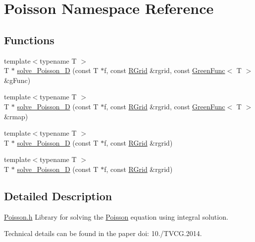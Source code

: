 \hypertarget{namespace_poisson}{}\section{Poisson Namespace Reference}
\label{namespace_poisson}
\subsection*{Functions}
\begin{DoxyCompactItemize}
\item 
{\footnotesize template$<$typename T $>$ }\\T $\ast$ \hyperlink{namespace_poisson_a28367c6c5e9568c1d031cad62354676d}{solve\+\_\+\+Poisson\+\_\+D} (const T $\ast$f, const \hyperlink{struct_r_grid}{R\+Grid} \&rgrid, const \hyperlink{class_green_func}{Green\+Func}$<$ T $>$ \&g\+Func)
\item 
{\footnotesize template$<$typename T $>$ }\\T $\ast$ \hyperlink{namespace_poisson_a7c7163908fcf6a2b0444e3ad1b808156}{solve\+\_\+\+Poisson\+\_\+D} (const T $\ast$f, const \hyperlink{struct_r_grid}{R\+Grid} \&rgrid, const \hyperlink{class_green_func}{Green\+Func}$<$ T $>$ \&rmap)
\item 
{\footnotesize template$<$typename T $>$ }\\T $\ast$ \hyperlink{namespace_poisson_ae5286eed57168b5680b7ae461daa397b}{solve\+\_\+\+Poisson\+\_\+D} (const T $\ast$f, const \hyperlink{struct_r_grid}{R\+Grid} \&rgrid)
\item 
{\footnotesize template$<$typename T $>$ }\\T $\ast$ \hyperlink{namespace_poisson_a2f8b970787c61714b9a4ef75d5fe799c}{solve\+\_\+\+Poisson\+\_\+D} (const T $\ast$f, const \hyperlink{struct_r_grid}{R\+Grid} \&rgrid)
\end{DoxyCompactItemize}


\subsection{Detailed Description}


 \hyperlink{_poisson_8h}{Poisson.\+h} Library for solving the \hyperlink{namespace_poisson}{Poisson} equation using integral solution.
\begin{DoxyItemize}
\item Technical details can be found in the paper doi\+: 10./\+T\+V\+C\+G.2014.
\end{DoxyItemize}

